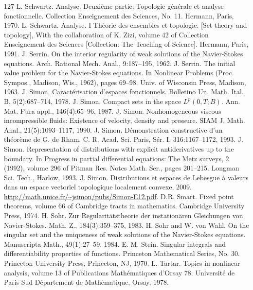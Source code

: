 \begin{thebibliography}{127}
 L. Schwartz. Analyse. Deuxième partie: Topologie générale et analyse fonctionnelle. Collection Enseignement des Sciences, No. 11. Hermann, Paris, 1970.
 L. Schwartz. Analyse. I Théorie des ensembles et topologie. [Set theory and topology], With the collaboration of K. Zizi, volume 42 of Collection Enseignement des Sciences [Collection: The Teaching of Science]. Hermann, Paris, 1991.
 J. Serrin. On the interior regularity of weak solutions of the Navier-Stokes equations. Arch. Rational Mech. Anal., 9:187–195, 1962.
 J. Serrin. The initial value problem for the Navier-Stokes equations. In Nonlinear Problems (Proc. Sympos., Madison, Wis., 1962), pages 69–98. Univ. of Wisconsin Press, Madison, 1963.
 J. Simon. Caractérisation d’espaces fonctionnels. Bolletino Un. Math. Ital. B, 5(2):687–714, 1978.
 J. Simon. Compact sets in the space $L^p(0,T;B)$. Ann. Mat. Pura appl., 146(4):65–96, 1987.
 J. Simon. Nonhomogeneous viscous incompressible fluids: Existence of velocity, density and pressure. SIAM J. Math. Anal., 21(5):1093–1117, 1990.
 J. Simon. Démonstration constructive d’un théorème de G. de Rham. C. R. Acad. Sci. Paris, Sér. I, 316:1167–1172, 1993.
 J. Simon. Representation of distributions with explicit antiderivatives up to the boundary. In Progress in partial differential equations: The Metz surveys, 2 (1992), volume 296 of Pitman Res. Notes Math. Ser., pages 201–215. Longman Sci. Tech., Harlow, 1993.
 J. Simon. Distributions et espaces de Lebesgue à valeurs dans un espace vectoriel topologique localement convexe, 2009. \url{http://math.unice.fr/~jsimon/pubs/Simon-E12.pdf}.
 D.R. Smart. Fixed point theorems, volume 66 of Cambridge tracts in mathematics. Cambridge University Press, 1974.
 H. Sohr. Zur Regularitätstheorie der instationären Gleichungen von Navier-Stokes. Math. Z., 184(3):359–375, 1983.
 H. Sohr and W. von Wahl. On the singular set and the uniqueness of weak solutions of the Navier-Stokes equations. Manuscripta Math., 49(1):27–59, 1984.
 E. M. Stein. Singular integrals and differentiability properties of functions. Princeton Mathematical Series, No. 30. Princeton University Press, Princeton, NJ, 1970.
 L. Tartar. Topics in nonlinear analysis, volume 13 of Publications Mathématiques d’Orsay 78. Université de Paris-Sud Département de Mathématique, Orsay, 1978.

\end{thebibliography}
